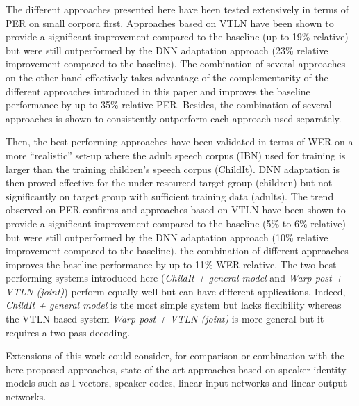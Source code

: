 \documentclass{nle}
\begin{document}
The different approaches presented here have been tested extensively in terms of PER on small corpora first. Approaches based on VTLN have been shown to provide a significant improvement compared to the baseline (up to 19\% relative) but were still outperformed by the DNN adaptation approach (23\% relative improvement compared to the baseline). The combination of several approaches on the other hand effectively takes advantage of the complementarity of the different approaches introduced in this paper and improves the baseline performance by up to 35\% relative PER. Besides, the combination of several approaches is shown to consistently outperform each approach used separately.

Then, the best performing approaches have been validated in terms of WER on a more ``realistic'' set-up where the adult speech corpus (IBN) used for training is larger than the training children's speech corpus (ChildIt). DNN adaptation is then proved effective for the  under-resourced target group (children) but not significantly on target group with sufficient training data (adults). The trend observed on PER confirms and approaches based on VTLN have been shown to provide a significant improvement compared to the baseline (5\% to 6\% relative) but were still outperformed by the DNN adaptation approach (10\% relative improvement compared to the baseline). the combination of different approaches improves the baseline performance by up to 11\% WER relative. The two best performing systems introduced here ({\em ChildIt + general model} and {\em Warp-post + VTLN (joint)}) perform equally well but can have different applications. Indeed, {\em ChildIt + general model} is the most simple system but lacks flexibility  whereas the VTLN based system {\em Warp-post + VTLN (joint)} is more general but it requires a two-pass decoding.

%
%
Extensions   of  this   work  could   consider,  for   comparison  or
combination  with  the  here  proposed  approaches,  state-of-the-art
approaches based on speaker identity models such as 
I-vectors,  speaker codes,  linear input
networks  and  linear  output  networks.

\end{document}
